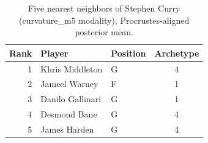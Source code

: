 \begin{table}[htbp]
  \centering\small
  \begin{tabular}{rllc}
    \toprule
    Rank & Player & Position & Archetype \\
    \midrule
    1 & Khris Middleton & G & 4 \\
    2 & Jameel Warney & F & 1 \\
    3 & Danilo Gallinari & G & 1 \\
    4 & Desmond Bane & G & 4 \\
    5 & James Harden & G & 4 \\
    \bottomrule
  \end{tabular}
  \caption{Five nearest neighbors of Stephen Curry (curvature_m5 modality), Procrustes-aligned posterior mean.}
  \label{tab:Stephen_Curry_neighbors_curvature_m5}
\end{table}

